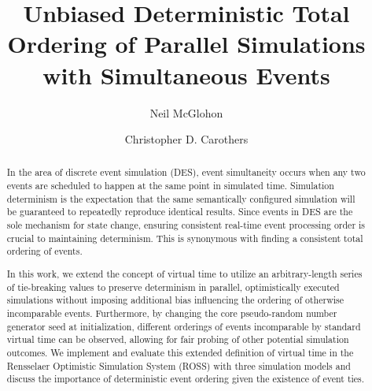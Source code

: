 \documentclass[nonacm,sigconf]{acmart}
\begin{document}
\setlength{\floatsep}{5pt plus 2pt minus 2pt}
\setlength{\textfloatsep}{5pt plus 2pt minus 2pt}

\title{Unbiased Deterministic Total Ordering of Parallel Simulations with Simultaneous Events}

\author{Neil McGlohon}

\author{Christopher D. Carothers}

\begin{abstract}
  In the area of discrete event simulation (DES), event simultaneity occurs when any two events are scheduled to happen at the same point in simulated time. Simulation determinism is the expectation that the same semantically configured simulation will be guaranteed to repeatedly reproduce identical results. Since events in DES are the sole mechanism for state change, ensuring consistent real-time event processing order is crucial to maintaining determinism. This is synonymous with finding a consistent total ordering of events.
  
  
  In this work, we extend the concept of virtual time to utilize an arbitrary-length series of tie-breaking values to preserve determinism in parallel, optimistically executed simulations without imposing additional bias influencing the ordering of otherwise incomparable events. Furthermore, by changing the core pseudo-random number generator seed at initialization, different orderings of events incomparable by standard virtual time can be observed, allowing for fair probing of other potential simulation outcomes. We implement and evaluate this extended definition of virtual time in the Rensselaer Optimistic Simulation System (ROSS) with three simulation models and discuss the importance of deterministic event ordering given the existence of event ties.
\end{abstract}
\end{document}
